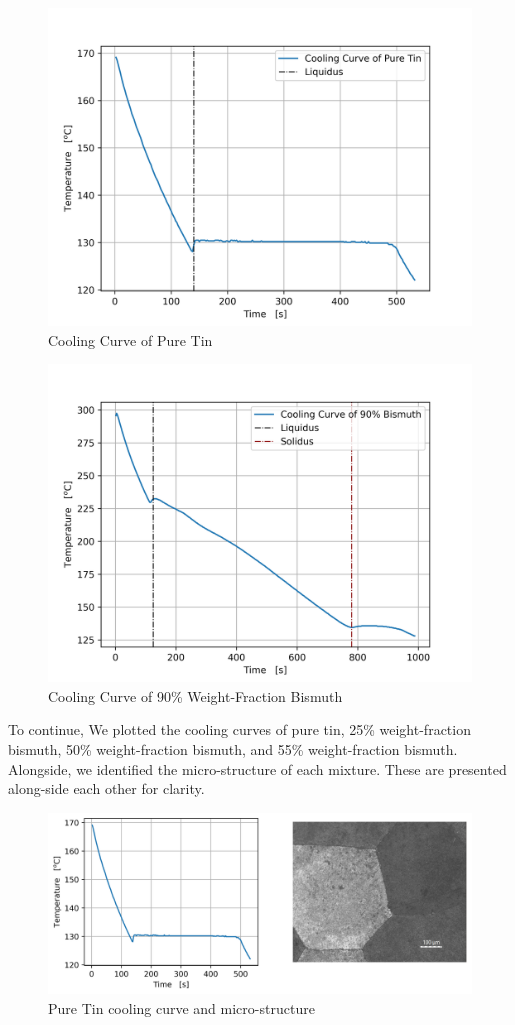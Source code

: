 \documentclass{article}
\begin{document}
\begin{figure}
    \centering
    \includegraphics[width=0.5\linewidth]{plots/q1_00.png}
    \caption{Cooling Curve of Pure Tin}
    \label{fig:q1-00}
\end{figure}

\begin{figure}
    \centering
    \includegraphics[width=0.5\linewidth]{plots/q1_90.png}
    \caption{Cooling Curve of 90\% Weight-Fraction Bismuth}
    \label{fig:q1-90}
\end{figure}

To continue, We plotted the cooling curves of pure tin, 25\% weight-fraction bismuth, 50\% weight-fraction bismuth, and 55\% weight-fraction bismuth. Alongside, we identified the micro-structure of each mixture. These are presented along-side each other for clarity. 

\begin{figure}
    \centering
    \includegraphics[width=1\linewidth]{plots/q2_00.png}
    \caption{Pure Tin cooling curve and micro-structure}
    \label{fig:q2-00}
\end{figure}
\end{document}
